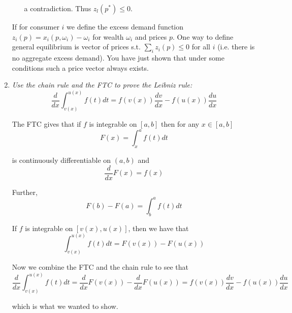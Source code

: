 \documentclass{article}
\begin{document}
\begin{enumerate}[1.]
\begin{enumerate}[a)]
        a contradiction. Thus $z_l(p^*) \le 0$.
    \end{enumerate}

  \begin{remark}
    If for consumer $i$ we define the excess demand function $z_i(p) = x_i(p, \omega_i) - \omega_i$ for wealth $\omega_i$ and prices $p$. One way to define general equilibrium is vector of prices s.t. $\sum^{}_{i} z_i(p) \le 0$ for all $i$ (i.e. there is no aggregate excess demand). You have just shown that under some conditions such a price vector always exists.
  \end{remark}

  \item \textit{Use the chain rule and the FTC to prove the Leibniz rule:}
    \[
      \dfrac{d}{dx} \int_{v(x)}^{u(x)} f(t) dt
      =
      f(v(x)) \dfrac{dv}{dx}
      - f(u(x)) \dfrac{du}{dx}
    \]

    \solution The FTC gives that if $f$ is integrable on $[a, b]$ then for any $x \in [a, b]$
    \[
      F(x) = \int_{x}^{a} f(t) dt
    \]

    is continuously differentiable on $(a, b)$ and
    \[
      \dfrac{d}{dx} F(x) = f(x)
    \]

    Further,
    \[
      F(b) - F(a) = \int_{b}^{a} f(t) dt
    \]

    If $f$ is integrable on $[v(x), u(x)]$, then we have that
    \[
      \int_{v(x)}^{u(x)} f(t) dt
      =
      F(v(x)) - F(u(x))
    \]

    Now we combine the FTC and the chain rule to see that
    \[
      \dfrac{d}{dx} \int_{v(x)}^{u(x)} f(t) dt
      =
      \dfrac{d}{dx} F(v(x)) - \dfrac{d}{dx} F(u(x))
      =
      f(v(x)) \dfrac{dv}{dx} - f(u(x)) \dfrac{du}{dx}
    \]

    which is what we wanted to show.
\end{enumerate}

\end{document}
